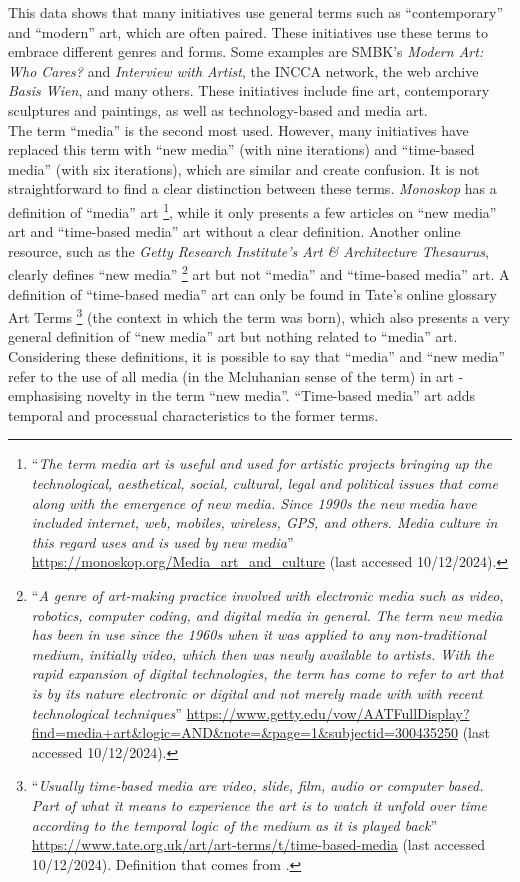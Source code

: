 This data shows that many initiatives use general terms such as ``contemporary'' and ``modern'' art, which are often paired. These initiatives use these terms to embrace different genres and forms. Some examples are SMBK’s \textit{Modern Art: Who Cares?} and \textit{Interview with Artist}, the INCCA network, the web archive \textit{Basis Wien}, and many others. These initiatives include fine art, contemporary sculptures and paintings, as well as technology-based and media art.\\
The term ``media'' is the second most used. However, many initiatives have replaced this term with ``new media'' (with nine iterations) and ``time-based media'' (with six iterations), which are similar and create confusion. It is not straightforward to find a clear distinction between these terms. \textit{Monoskop} has a definition of ``media'' art \footnote{``\textit{The term media art is useful and used for artistic projects bringing up the technological, aesthetical, social, cultural, legal and political issues that come along with the emergence of new media. Since 1990s the new media have included internet, web, mobiles, wireless, GPS, and others. Media culture in this regard uses and is used by new media}” \url{https://monoskop.org/Media_art_and_culture} (last accessed 10/12/2024).}, while it only presents a few articles on ``new media'' art and ``time-based media'' art without a clear definition. Another online resource, such as the \textit{Getty Research Institute's Art \& Architecture Thesaurus}, clearly defines ``new media'' \footnote{``\textit{A genre of art-making practice involved with electronic media such as video, robotics, computer coding, and digital media in general. The term new media has been in use since the 1960s when it was applied to any non-traditional medium, initially video, which then was newly available to artists. With the rapid expansion of digital technologies, the term has come to refer to art that is by its nature electronic or digital and not merely made with with recent technological techniques}” \url{https://www.getty.edu/vow/AATFullDisplay?find=media+art&logic=AND&note=&page=1&subjectid=300435250} (last accessed 10/12/2024).} art but not ``media'' and ``time-based media'' art. A definition of ``time-based media'' art can only be found in Tate's online glossary Art Terms \footnote{``\textit{Usually time-based media are video, slide, film, audio or computer based. Part of what it means to experience the art is to watch it unfold over time according to the temporal logic of the medium as it is played back}” \url{https://www.tate.org.uk/art/art-terms/t/time-based-media} (last accessed 10/12/2024). Definition that comes from \cite{laurenson2006authenticity}.} (the context in which the term was born), which also presents a very general definition of ``new media'' art but nothing related to ``media'' art. Considering these definitions, it is possible to say that ``media'' and ``new media'' refer to the use of all media (in the Mcluhanian sense of the term) in art - emphasising novelty in the term ``new media''. ``Time-based media'' art adds temporal and processual characteristics to the former terms.\\  
